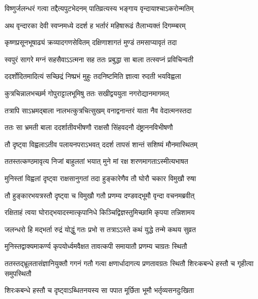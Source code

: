 


\twolineshloka
{विष्णुर्जलन्धरं गत्वा तद्दैत्यपुटभेदनम्}
{पातिव्रत्यस्य भङ्गाय वृन्दायाश्चाऽकरोन्मतिम्} %

\twolineshloka
{अथ वृन्दारका देवी स्वप्नमध्ये ददर्श ह}
{भर्तारं महिषारूढं तैलाभ्यक्तं दिगम्म्बरम्} %

\twolineshloka
{कृष्णप्रसूनभूषाढ्यं क्रव्यादगणसेवितम्}
{दक्षिणाशागतं मुण्डं तमसाप्यावृतं तदा} %

\twolineshloka
{स्वपुरं सागरे मग्नं सहसैवाऽऽत्मना सह}
{ततः प्रबुद्धा सा बाला तत्स्वप्नं प्रविचिन्वती} %

\twolineshloka
{ददर्शोदितमादित्यं सच्छिद्रं निष्प्रभं मुहुः}
{तदनिष्टमिति ज्ञात्वा रुदती भयविह्वला} %

\twolineshloka
{कुत्रचिन्नालभच्छर्म गोपुराट्टालभूमिषु}
{ततः सखीद्वययुता नगरोद्यानमागमत्} %

\twolineshloka
{तत्रापि साऽभ्रमद्बाला नालभत्कुत्रचित्सुखम्}
{वनाद्वनान्तरं याता नैव वेदात्मनस्तदा} %

\twolineshloka
{ततः सा भ्रमती बाला ददर्शातीवभीषणौ}
{राक्षसौ सिंहवदनौ दंष्ट्राननविभीषणौ} %

\twolineshloka
{तौ दृष्ट्वा विह्वलाऽतीव पलायनपराऽभवत्}
{ददर्श तापसं शान्तं सशिष्यं मौनमास्थितम्} %

\twolineshloka
{ततस्तत्कण्ठमावृत्य निजां बाहुलतां भयात्}
{मुने मां रक्ष शरणमागताऽस्मीत्यभाषत} %

\twolineshloka
{मुनिस्तां विह्वलां दृष्ट्वा राक्षसानुगतां तदा}
{हुङ्कारेणैव तौ घोरौ चकार विमुखौ रुषा} %

\twolineshloka
{तौ हुङ्कारभयत्रस्तौ दृष्ट्वा च विमुखौ गतौ}
{प्रणम्य दण्डवद्भूमौ वृन्दा वचनमब्रवीत्} %


\twolineshloka
{रक्षिताहं त्वया घोराद्भयादस्मात्कृपानिधे}
{किञ्चिद्विज्ञस्तुमिच्छामि कृपया तन्निशामय} %

\twolineshloka
{जलन्धरो हि मद्भर्ता रुद्रं योद्धुं गतः प्रभो}
{स तत्राऽऽस्ते कथं युद्धे तन्मे कथय सुव्रत} %


\twolineshloka
{मुनिस्तद्वाक्यमाकर्ण्य कृपयोर्ध्वमवैक्षत}
{तावत्कपी समायातौ प्रणम्य चाग्रतः स्थितौ} %

\threelineshloka
{ततस्तद्भ्रूलतासंज्ञानियुक्तौ गगनं गतौ}
{गत्वा क्षणार्धादागत्य प्रणतावग्रतः स्थितौ}
{शिरःकबन्धे हस्तौ च गृहीत्वा समुपस्थितौ} %

\twolineshloka
{शिरःकबन्धे हस्तौ च दृष्ट्वाऽब्धितनयस्य सा}
{पपात मूर्छिता भूमौ भर्तृव्यसनदुःखिता} %

